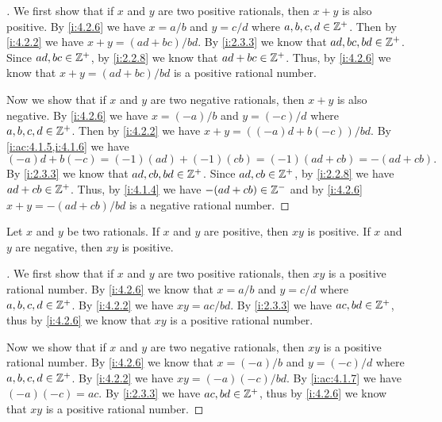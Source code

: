 \begin{proof}[]
  We first show that if \(x\) and \(y\) are two positive rationals, then \(x + y\) is also positive.
  By \cref{i:4.2.6} we have \(x = a / b\) and \(y = c / d\) where \(a, b, c, d \in \mathbb{Z}^+\).
  Then by \cref{i:4.2.2} we have \(x + y = (ad + bc) / bd\).
  By \cref{i:2.3.3} we know that \(ad, bc, bd \in \mathbb{Z}^+\).
  Since \(ad, bc \in \mathbb{Z}^+\), by \cref{i:2.2.8} we know that \(ad + bc \in \mathbb{Z}^+\).
  Thus, by \cref{i:4.2.6} we know that \(x + y = (ad + bc) / bd\) is a positive rational number.

  Now we show that if \(x\) and \(y\) are two negative rationals, then \(x + y\) is also negative.
  By \cref{i:4.2.6} we have \(x = (-a) / b\) and \(y = (-c) / d\) where \(a, b, c, d \in \mathbb{Z}^+\).
  Then by \cref{i:4.2.2} we have \(x + y = ((-a)d + b(-c)) / bd\).
  By \cref{i:ac:4.1.5,i:4.1.6} we have
  \[
    (-a)d + b(-c) = (-1) (ad) + (-1) (cb) = (-1)(ad + cb) = -(ad + cb).
  \]
  By \cref{i:2.3.3} we know that \(ad, cb, bd \in \mathbb{Z}^+\).
  Since \(ad, cb \in \mathbb{Z}^+\), by \cref{i:2.2.8} we have \(ad + cb \in \mathbb{Z}^+\).
  Thus, by \cref{i:4.1.4} we have \(-(ad + cb) \in \mathbb{Z}^-\) and by \cref{i:4.2.6} \(x + y = -(ad + cb) / bd\) is a negative rational number.
\end{proof}

\begin{ac}\label{i:ac:4.2.7}
  Let \(x\) and \(y\) be two rationals.
  If \(x\) and \(y\) are positive, then \(xy\) is positive.
  If \(x\) and \(y\) are negative, then \(xy\) is positive.
\end{ac}

\begin{proof}[]
  We first show that if \(x\) and \(y\) are two positive rationals, then \(xy\) is a positive rational number.
  By \cref{i:4.2.6} we know that \(x = a / b\) and \(y = c / d\) where \(a, b, c, d \in \mathbb{Z}^+\).
  By \cref{i:4.2.2} we have \(xy = ac / bd\).
  By \cref{i:2.3.3} we have \(ac, bd \in \mathbb{Z}^+\), thus by \cref{i:4.2.6} we know that \(xy\) is a positive rational number.

  Now we show that if \(x\) and \(y\) are two negative rationals, then \(xy\) is a positive rational number.
  By \cref{i:4.2.6} we know that \(x = (-a) / b\) and \(y = (-c) / d\) where \(a, b, c, d \in \mathbb{Z}^+\).
  By \cref{i:4.2.2} we have \(xy = (-a)(-c) / bd\).
  By \cref{i:ac:4.1.7} we have \((-a)(-c) = ac\).
  By \cref{i:2.3.3} we have \(ac, bd \in \mathbb{Z}^+\), thus by \cref{i:4.2.6} we know that \(xy\) is a positive rational number.
\end{proof}

